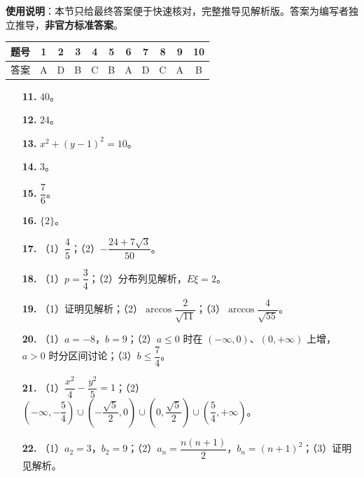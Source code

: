
\begin{gknotice}
\textbf{使用说明}：本节只给最终答案便于快速核对，完整推导见解析版。答案为编写者独立推导，\textbf{非官方标准答案}。
\end{gknotice}

\begin{center}\begin{tabular}{ccccccccccc}
\toprule
题号 & 1 & 2 & 3 & 4 & 5 & 6 & 7 & 8 & 9 & 10 \\
\midrule
答案 & A & D & B & C & B & A & D & C & A & B \\
\bottomrule
\end{tabular}\end{center}

\begin{itemize}[leftmargin=2.6em]
  \item[\textbf{11.}] $40$。
  \item[\textbf{12.}] $24$。
  \item[\textbf{13.}] $x^2+(y-1)^2=10$。
  \item[\textbf{14.}] $3$。
  \item[\textbf{15.}] $\dfrac76$。
  \item[\textbf{16.}] $\{2\}$。
\end{itemize}

\begin{itemize}[leftmargin=2.6em]
  \item[\textbf{17.}] （1）$\dfrac45$；（2）$-\dfrac{24+7\sqrt3}{50}$。
  \item[\textbf{18.}] （1）$p=\dfrac34$；（2）分布列见解析，$E\xi=2$。
  \item[\textbf{19.}] （1）证明见解析；（2）$\arccos\dfrac2{\sqrt{11}}$；（3）$\arccos\dfrac4{\sqrt{55}}$。
  \item[\textbf{20.}] （1）$a=-8$，$b=9$；（2）$a\leqslant0$ 时在 $(-\infty,0)$、$(0,+\infty)$ 上增，$a>0$ 时分区间讨论；（3）$b\leqslant\dfrac74$。
  \item[\textbf{21.}] （1）$\dfrac{x^2}4-\dfrac{y^2}5=1$；（2）$\left(-\infty,-\dfrac54\right)\cup\left(-\dfrac{\sqrt5}2,0\right)\cup\left(0,\dfrac{\sqrt5}2\right)\cup\left(\dfrac54,+\infty\right)$。
  \item[\textbf{22.}] （1）$a_2=3$，$b_2=9$；（2）$a_n=\dfrac{n(n+1)}2$，$b_n=(n+1)^2$；（3）证明见解析。
\end{itemize}

